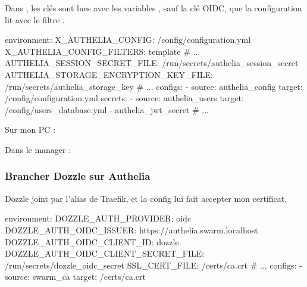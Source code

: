 Dans , les clés sont lues avec les variables , sauf la clé OIDC, que la configuration lit avec le filtre .

\begin{fichier}
    environment:
      X_AUTHELIA_CONFIG: /config/configuration.yml
      X_AUTHELIA_CONFIG_FILTERS: template
      # ...
      AUTHELIA_SESSION_SECRET_FILE: /run/secrets/authelia_session_secret
      AUTHELIA_STORAGE_ENCRYPTION_KEY_FILE: /run/secrets/authelia_storage_key
      # ...
    configs:
      - source: authelia_config
        target: /config/configuration.yml
    secrets:
      - source: authelia_users
        target: /config/users_database.yml
      - authelia_jwt_secret
      # ...
\end{fichier}

Sur mon PC :

\begin{commandes}
\end{commandes}

Dans le manager :

\begin{commandes}
\end{commandes}


\subsubsection{Brancher Dozzle sur Authelia}

Dozzle joint  par l'alias de Traefik, et la config  lui fait accepter mon certificat.

\begin{fichier}
    environment:
      DOZZLE_AUTH_PROVIDER: oidc
      DOZZLE_AUTH_OIDC_ISSUER: https://authelia.swarm.localhost
      DOZZLE_AUTH_OIDC_CLIENT_ID: dozzle
      DOZZLE_AUTH_OIDC_CLIENT_SECRET_FILE: /run/secrets/dozzle_oidc_secret
      SSL_CERT_FILE: /certs/ca.crt
    # ...
    configs:
      - source: swarm_ca
        target: /certs/ca.crt
\end{fichier}

